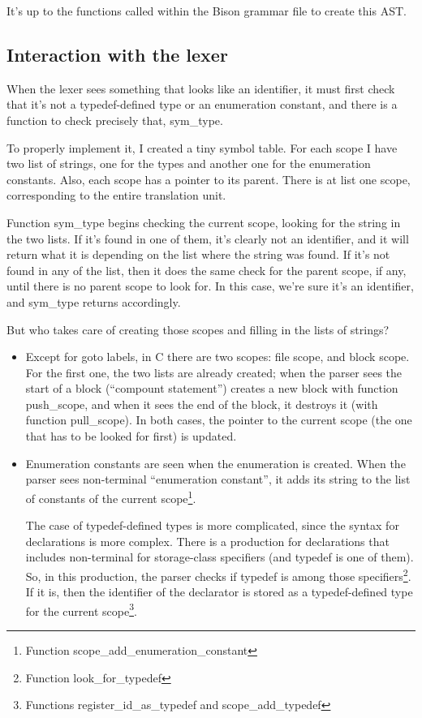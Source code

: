 \documentclass[a4paper,openany]{refrep}
\begin{document}
It's up to the functions called within the Bison grammar file to create this AST.

\subsection{Interaction with the lexer}
When the lexer sees something that looks like an identifier, it must first check that it's not a typedef-defined type or an enumeration constant, and there is a function to check precisely that, sym\_type.

To properly implement it, I created a tiny symbol table. For each scope I have two list of strings, one for the types and another one for the enumeration constants. Also, each scope has a pointer to its parent. There is at list one scope, corresponding to the entire translation unit.

Function sym\_type begins checking the current scope, looking for the string in the two lists. If it's found in one of them, it's clearly not an identifier, and it will return what it is depending on the list where the string was found. If it's not found in any of the list, then it does the same check for the parent scope, if any, until there is no parent scope to look for. In this case, we're sure it's an identifier, and sym\_type returns accordingly.

But who takes care of creating those scopes and filling in the lists of strings?

\begin{itemize}
\item Except for goto labels, in C there are two scopes: file scope, and block scope. For the first one, the two lists are already created; when the parser sees the start of a block (``compount statement'') creates a new block with function push\_scope, and when it sees the end of the block, it destroys it (with function pull\_scope). In both cases, the pointer to the current scope (the one that has to be looked for first) is updated.

\item Enumeration constants are seen when the enumeration is created. When the parser sees non-terminal ``enumeration constant'', it adds its string to the list of constants of the current scope\footnote{Function scope\_add\_enumeration\_constant}.

The case of typedef-defined types is more complicated, since the syntax for declarations is more complex. There is a production for declarations that includes non-terminal for storage-class specifiers (and typedef is one of them). So, in this production, the parser checks if typedef is among those specifiers\footnote{Function look\_for\_typedef}. If it is, then the identifier of the declarator is stored as a typedef-defined type for the current scope\footnote{Functions register\_id\_as\_typedef and scope\_add\_typedef}.
\end{itemize}
\end{document}

